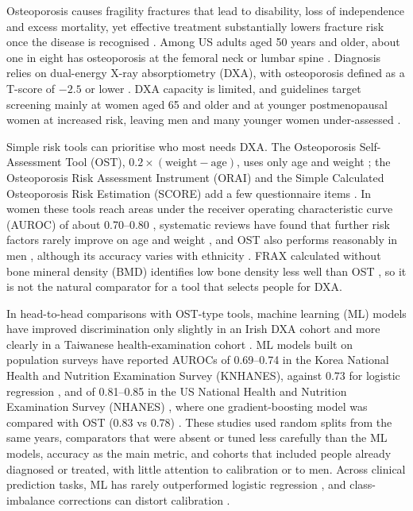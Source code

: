 \documentclass[11pt,a4paper]{article}
\begin{document}
Osteoporosis causes fragility fractures that lead to disability, loss of independence and excess mortality, yet effective treatment substantially lowers fracture risk once the disease is recognised \cite{compston2019}. Among US adults aged 50 years and older, about one in eight has osteoporosis at the femoral neck or lumbar spine \cite{sarafrazi2021}. Diagnosis relies on dual-energy X-ray absorptiometry (DXA), with osteoporosis defined as a T-score of $-2.5$ or lower \cite{kanis1994}. DXA capacity is limited, and guidelines target screening mainly at women aged 65 and older and at younger postmenopausal women at increased risk, leaving men and many younger women under-assessed \cite{uspstf2025}.

Simple risk tools can prioritise who most needs DXA. The Osteoporosis Self-Assessment Tool (OST), $0.2\times(\text{weight}-\text{age})$, uses only age and weight \cite{geusens2002,koh2001}; the Osteoporosis Risk Assessment Instrument (ORAI) and the Simple Calculated Osteoporosis Risk Estimation (SCORE) add a few questionnaire items \cite{cadarette2000,lydick1998}. In women these tools reach areas under the receiver operating characteristic curve (AUROC) of about 0.70--0.80 \cite{geusens2002,rud2007,gourlay2008}, systematic reviews have found that further risk factors rarely improve on age and weight \cite{rubin2013,nayak2015}, and OST also performs reasonably in men \cite{adler2003,lynn2008,diem2017}, although its accuracy varies with ethnicity \cite{cass2006}. FRAX calculated without bone mineral density (BMD) identifies low bone density less well than OST \cite{crandall2014,diem2017}, so it is not the natural comparator for a tool that selects people for DXA.

In head-to-head comparisons with OST-type tools, machine learning (ML) models have improved discrimination only slightly in an Irish DXA cohort \cite{e2021} and more clearly in a Taiwanese health-examination cohort \cite{ouyang2021}. ML models built on population surveys have reported AUROCs of 0.69--0.74 in the Korea National Health and Nutrition Examination Survey (KNHANES), against 0.73 for logistic regression \cite{shim2020,suh2023}, and of 0.81--0.85 in the US National Health and Nutrition Examination Survey (NHANES) \cite{tang2023,zhangy2025,zhang2025}, where one gradient-boosting model was compared with OST (0.83 vs 0.78) \cite{zhangy2025}. These studies used random splits from the same years, comparators that were absent or tuned less carefully than the ML models, accuracy as the main metric, and cohorts that included people already diagnosed or treated, with little attention to calibration or to men. Across clinical prediction tasks, ML has rarely outperformed logistic regression \cite{christodoulou2019}, and class-imbalance corrections can distort calibration \cite{vandengoorbergh2022}.
\end{document}
